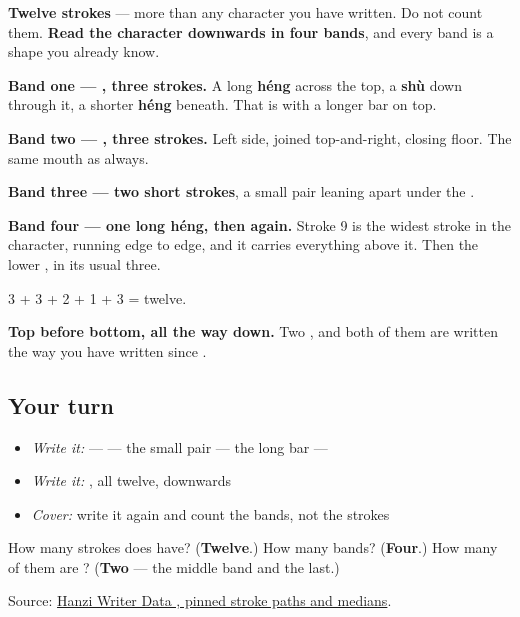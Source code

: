 \begin{quote}
\end{quote}

\textbf{Twelve strokes} — more than any character you have written. Do not count them. \textbf{Read the character downwards in four bands}, and every band is a shape you already know.

\textbf{Band one — , three strokes.} A long \textbf{héng} across the top, a \textbf{shù} down through it, a shorter \textbf{héng} beneath. That is  with a longer bar on top.

\textbf{Band two — , three strokes.} Left side, joined top-and-right, closing floor. The same mouth as always.

\textbf{Band three — two short strokes}, a small pair leaning apart under the .

\textbf{Band four — one long héng, then  again.} Stroke 9 is the widest stroke in the character, running edge to edge, and it carries everything above it. Then the lower , in its usual three.

3 + 3 + 2 + 1 + 3 = twelve.

\textbf{Top before bottom, all the way down.} Two , and both of them are written the way you have written  since .

\subsection*{Your turn}
\begin{itemize}
\raggedright
  \item \emph{Write it:}  —  — the small pair — the long bar — 
  \item \emph{Write it:} , all twelve, downwards
  \item \emph{Cover:} write it again and count the bands, not the strokes
\end{itemize}

\begin{tcolorbox}[breakable,colback=teal!4,colframe=teal!35!black,title={Before you move on}]
How many strokes does  have? (\textbf{Twelve}.) How many bands? (\textbf{Four}.) How many of them are ? (\textbf{Two} — the middle band and the last.)

Source: \href{https://raw.githubusercontent.com/chanind/hanzi-writer-data/68d10a4b21150cae5e1ebbd223eed289cf32d90c/data/\%E5\%96\%9C.json}{Hanzi Writer Data , pinned stroke paths and medians}.
\end{tcolorbox}
